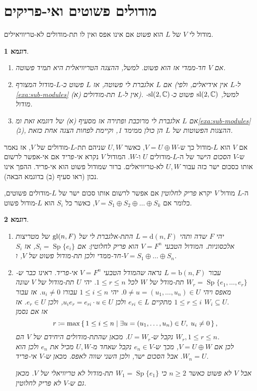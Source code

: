 \documentclass{report}
\theoremstyle{break}
\newtheorem{example}[example]{דוגמא}
\theoremstyle{MyNonumberbreak}
\DeclareMathOperator{\Sp}{Sp}
\begin{document}
\section{מודולים פשוטים ואי-פריקים}
מודול לי $V$ של $L$ הוא \textit{פשוט} אם אינו אפס ואין לו תת-מודולים לא-טריוויאילים.
\begin{example} \label{exa:simple-modules}
	\begin{enumerate}[label=(\alph*)]
		\item 
		אם $V$ חד-ממדי אז הוא פשוט. למשל, ההצגה הטריוויאלית היא תמיד פשוטה.
		\item
		אם $L$ אלגברת לי פשוטה, אז $L$ פשוט כ-$L$-מודול המצורף (ל-$L$ אין אידיאלים, ולפי \autoref*{exa:sub-modules} (א) אין ל-$L$ תת-מודולים). למשל, $\operatorname{sl}(2, \operatorname{\mathbb{C}})$ פשוט כ-$\operatorname{sl}(2, \operatorname{\mathbb{C}})$-מודול.
		\item
		אם $L$ אלגברת לי מרוכבת ופתירה אז מסעיף (א) של דוגמא זאת ומ\autoref*{exa:sub-modules} (ג), ההצגות הפשוטות של $L$ הן כולן ממימד 1, וקיימת לפחות הצגה אחת כזאת.
	\end{enumerate}
\end{example}
אם $V$ הוא $L$-מודול כך ש-$V = U \oplus W$, כאשר $U, W$ שניהם תת-$L$-מודולים של $V$, אז נאמר ש-$V$ \textit{הסכום הישר} של ה-$L$-מודולים $U$ ו-$W$. המודול $V$ נקרא \textit{אי-פריד} אם אי-אפשר לרשום אותו כסכום ישר כזה עבור $U, W$ לא-טריוויאלים. ברור שמודול פשוט הוא אי-פריד. ההפך אינו נכון (ראו סעיף (ב) בדוגמא הבאה).

ה-$L$ מודול $V$ יקרא \textit{פריק לחלוטין} אם אפשר לרשום אותו סכום ישר של $L$-מודולים פשוטים, כלומר אם $V = S_1 \oplus S_2 \oplus \ldots \oplus S_k$, כאשר כל $S_i$ הוא $L$-מודול פשוט.
\begin{example}
	\begin{enumerate}[label=(\alph*)]
		\item 
		יהי $F$ שדה ותהי $L = \mathrm{d}(n, F)$ התת-אלגברת לי של $\operatorname{gl}(n, F)$ של מטריצות אלכסוניות. המודול הטבעי $V = F^n$ הוא פריק לחלוטין: אם $S_i = \Sp\{e_i\}$, אז $S_i$ חד-ממדי ולכן תת-מודול פשוט של $V$, ו-$V = S_1 \oplus \ldots \oplus S_n$.
		\item
		עבור $L = \mathrm{b}(n, F)$ נראה שהמודל הטבעי $V = F^n$ אי-פריד. ראינו כבר ש-$W_r = \Sp\{e_1, \ldots, e_r\}$ תת-מודל של $W$ לכל $1 \le r \le n$. יהי $U$ תת-מודול של $V$ שונה מאפס ויהי $0 \neq u = (u_1, \ldots, u_n) \in U$. יהי $1 \le i \le n$ עבורו $u_i \neq 0$. אז עבור $1 \le r \le i$ מתקיים $e_{ri} \in L$ ולכן $u_ie_r = e_{ri} \cdot u \in U$, ולכן $e_r \in U$. אז $W_i \subseteq U$. \\		
		אז אם נסמן 
		\[ r \coloneqq \max\set{1 \le i \le n | \exists u = (u_1, \ldots, u_n) \in U, \; u_i \neq 0}, \]
		נקבל ש-$U = W_r$. מכאן שהתת-מודולים היחידם של $V$ הם $W_r, 1 \le r \le n$. \\
		לכן אם $V = U \oplus W$, מכך ש-$e_n \in V$ נקבל שאחד מ-$U, W$ מכיל את $e_n$ ולכן הוא $W_n = U$. אבל הסכום ישר, ולכן השני שווה לאפס. מכאן ש-$V$ אי-פריד.
		
		אבל $V$ לא פשוט כאשר $n \ge 2$ כי $W_1 = \Sp\{e_1\}$ תת-מודול לא טריוויאלי של $V$. מכאן גם ש-$V$ לא פריק לחלוטין.
	\end{enumerate}
\end{example}
\end{document}
